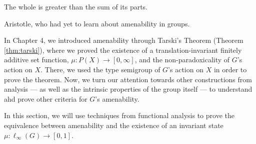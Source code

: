 \epigraph{The whole is greater than the sum of its parts.}{Aristotle, who had yet to learn about amenability in groups.}
In Chapter 4, we introduced amenability through Tarski's Theorem (Theorem \ref{thm:tarski}), where we proved the existence of a translation-invariant finitely additive set function, $\mu\colon P(X)\rightarrow [0,\infty]$, and the non-paradoxicality of $G$'s action on $X$. There, we used the type semigroup of $G$'s action on $X$ in order to prove the theorem. Now, we turn our attention towards other constructions from analysis --- as well as the intrinsic properties of the group itself --- to understand ahd prove other criteria for $G$'s amenability.\newline

In this section, we will use techniques from functional analysis to prove the equivalence between amenability and the existence of an invariant state $\mu\colon \ell_{\infty}(G) \rightarrow [0,1]$.
